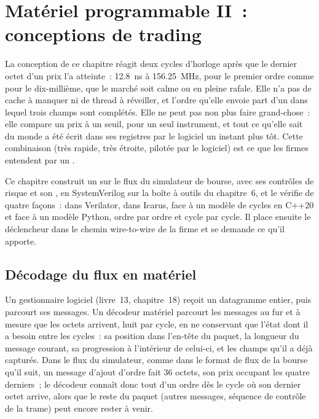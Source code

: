 \chapter{Matériel programmable II~: conceptions de trading}\label{ch:nw:programmable-hardware-ii-trading-designs}

La conception de ce chapitre réagit deux cycles d'horloge après que le dernier octet d'un prix l'a atteinte~: \qty{12.8}{\nano\second} à 156.25~MHz,
pour le premier ordre comme pour le dix-millième, que le marché soit calme ou en pleine rafale. Elle n'a pas de cache à manquer ni de thread à réveiller,
et l'ordre qu'elle envoie part d'un  dans lequel trois champs sont complétés. Elle ne peut pas non plus faire grand-chose~: elle compare un prix à un
seuil, pour un seul instrument, et tout ce qu'elle sait du monde a été écrit dans ses registres par le logiciel un instant plus tôt.
Cette combinaison (très rapide, très étroite, pilotée par le logiciel) est ce que les firmes entendent par un .

Ce chapitre construit un  sur le flux du simulateur de bourse, avec ses contrôles de risque et son , en SystemVerilog
sur la boîte à outils du chapitre~6, et le vérifie de quatre façons~: dans Verilator, dans Icarus, face à un modèle de cycles en C++20 et face à un modèle Python,
ordre par ordre et cycle par cycle. Il place ensuite le déclencheur dans le chemin wire-to-wire de la firme et se demande ce qu'il apporte.

\section{Décodage du flux en matériel}

Un gestionnaire logiciel (livre~13, chapitre~18) reçoit un datagramme entier, puis parcourt ses messages. Un décodeur matériel parcourt les
messages au fur et à mesure que les octets arrivent, huit par cycle, en ne conservant que l'état dont il a besoin entre les cycles~: sa position dans l'en-tête du paquet, la
longueur du message courant, sa progression à l'intérieur de celui-ci, et les champs qu'il a déjà capturés. Dans le flux du simulateur, comme dans le
format de flux de la bourse qu'il suit, un message d'ajout d'ordre fait 36 octets, son prix occupant les quatre derniers~; le décodeur connaît donc tout
d'un ordre dès le cycle où son dernier octet arrive, alors que le reste du paquet (autres messages, séquence de contrôle de la trame) peut encore
rester à venir.

